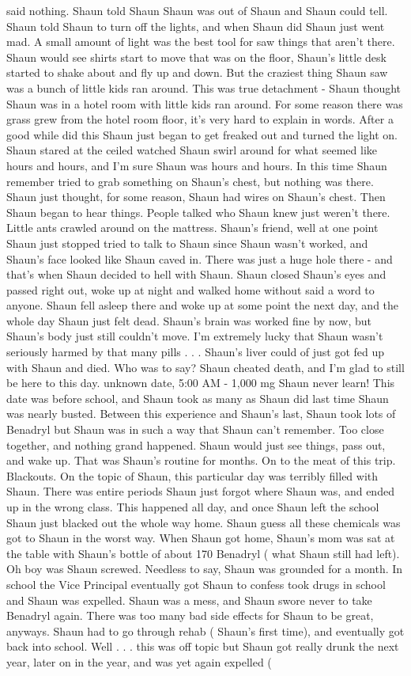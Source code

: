 \documentclass[12pt]{book}
\begin{document}
said nothing. Shaun told Shaun Shaun was out of Shaun and Shaun could tell. Shaun told Shaun to turn off the lights, and when Shaun did Shaun just went mad. A small amount of light was the best tool for saw things that aren't there. Shaun would see shirts start to move that was on the floor, Shaun's little desk started to shake about and fly up and down. But the craziest thing Shaun saw was a bunch of little kids ran around. This was true detachment - Shaun thought Shaun was in a hotel room with little kids ran around. For some reason there was grass grew from the hotel room floor, it's very hard to explain in words. After a good while did this Shaun just began to get freaked out and turned the light on. Shaun stared at the ceiled watched Shaun swirl around for what seemed like hours and hours, and I'm sure Shaun was hours and hours. In this time Shaun remember tried to grab something on Shaun's chest, but nothing was there. Shaun just thought, for some reason, Shaun had wires on Shaun's chest. Then Shaun began to hear things. People talked who Shaun knew just weren't there. Little ants crawled around on the mattress. Shaun's friend, well at one point Shaun just stopped tried to talk to Shaun since Shaun wasn't worked, and Shaun's face looked like Shaun caved in. There was just a huge hole there - and that's when Shaun decided to hell with Shaun. Shaun closed Shaun's eyes and passed right out, woke up at night and walked home without said a word to anyone. Shaun fell asleep there and woke up at some point the next day, and the whole day Shaun just felt dead. Shaun's brain was worked fine by now, but Shaun's body just still couldn't move. I'm extremely lucky that Shaun wasn't seriously harmed by that many pills . . .  Shaun's liver could of just got fed up with Shaun and died. Who was to say? Shaun cheated death, and I'm glad to still be here to this day. unknown date, 5:00 AM - 1,000 mg Shaun never learn! This date was before school, and Shaun took as many as Shaun did last time Shaun was nearly busted. Between this experience and Shaun's last, Shaun took lots of Benadryl but Shaun was in such a way that Shaun can't remember. Too close together, and nothing grand happened. Shaun would just see things, pass out, and wake up. That was Shaun's routine for months. On to the meat of this trip. Blackouts. On the topic of Shaun, this particular day was terribly filled with Shaun. There was entire periods Shaun just forgot where Shaun was, and ended up in the wrong class. This happened all day, and once Shaun left the school Shaun just blacked out the whole way home. Shaun guess all these chemicals was got to Shaun in the worst way. When Shaun got home, Shaun's mom was sat at the table with Shaun's bottle of about 170 Benadryl ( what Shaun still had left). Oh boy was Shaun screwed. Needless to say, Shaun was grounded for a month. In school the Vice Principal eventually got Shaun to confess took drugs in school and Shaun was expelled. Shaun was a mess, and Shaun swore never to take Benadryl again. There was too many bad side effects for Shaun to be great, anyways. Shaun had to go through rehab ( Shaun's first time), and eventually got back into school. Well . . .  this was off topic but Shaun got really drunk the next year, later on in the year, and was yet again expelled ( 
\end{document}
